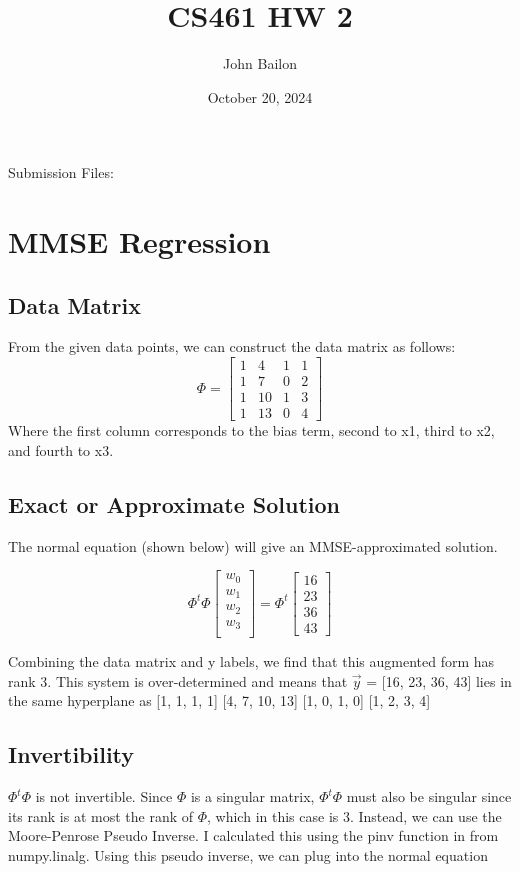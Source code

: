 \documentclass{article}
\title{CS461 HW 2}
\author{John Bailon}
\date{October 20, 2024}
\begin{document}
\maketitle

\noindent
Submission Files:

\section{MMSE Regression}
\subsection{Data Matrix}
From the given data points, we can construct the data matrix as follows:
\[
\Phi = \begin{bmatrix}
1 & 4 & 1 & 1\\
1 & 7 & 0 & 2\\
1 & 10 & 1 & 3\\
1 & 13 & 0 & 4
\end{bmatrix}
\]
\noindent
Where the first column corresponds to the bias term, second to x1, third to x2, and fourth to x3.

\subsection{Exact or Approximate Solution}

The normal equation (shown below) will give an MMSE-approximated solution.

\[
\Phi^t \Phi \begin{bmatrix}
w_0\\
w_1\\
w_2\\
w_3\\
\end{bmatrix} = \Phi^t \begin{bmatrix}
16\\
23\\
36\\
43
\end{bmatrix} 
\]

\noindent
Combining the data matrix and y labels, we find that this augmented form has rank 3. This system is over-determined and means that $\Vec{y}$ = [16, 23, 36, 43] lies in the same hyperplane as [1, 1, 1, 1] [4, 7, 10, 13] [1, 0, 1, 0] [1, 2, 3, 4]

\subsection{Invertibility}
$\Phi^t \Phi$ is not invertible. Since $\Phi$ is a singular matrix, $\Phi^t \Phi$ must also be singular since its rank is at most the rank of $\Phi$, which in this case is 3. Instead, we can use the Moore-Penrose Pseudo Inverse. I calculated this using the pinv function in from numpy.linalg. Using this pseudo inverse, we can plug into the normal equation
\end{document}
